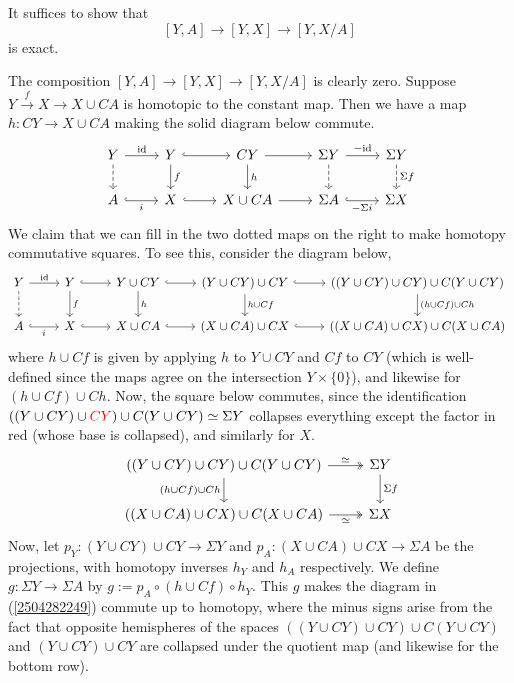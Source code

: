 \documentclass{MetricNotes2023}
\def\id{\ensuremath\text{id}}
\def\textcolour{\textcolor}
\begin{document}
\begin{ourproof}
It suffices to show that 
\[[Y,A]\to [Y,X]\to [Y, X/A]\]
is exact. 

The composition \([Y,A]\to [Y,X]\to [Y,X/A]\) is clearly zero. Suppose \(Y \xrightarrow{f} X \to X\cup CA\) is homotopic to the constant map. Then we have a map \(h : CY \to X\cup CA\) making the solid diagram below commute.
\begin{equation}\label{2504282249}
\begin{tikzcd} 
Y \arrow[r, "\id"] \arrow[d, swap, "", dashrightarrow]  & Y \arrow[r, "", hookrightarrow] \arrow[d, "f"] & CY \arrow[d, "h"] \arrow[r, ""] & \Sigma Y \arrow[d, "", dashrightarrow] \arrow[r, "-\id"] & \Sigma Y \arrow[d, "\Sigma f", dashrightarrow]\\ 
 A \arrow[r, swap, "i", hookrightarrow]  & X \arrow[r, ""', hookrightarrow] & X\cup CA \arrow[r, ""'] & \Sigma A \arrow[r, "-\Sigma i"', hookrightarrow] & \Sigma X 
\end{tikzcd}
\end{equation}
We claim that we can fill in the two dotted maps on the right to make homotopy commutative squares. To see this, consider the diagram below,
\[\begin{tikzcd} 
Y \arrow[r, "\id"] \arrow[d, swap, "", dashrightarrow]  & Y \arrow[r, "", hookrightarrow] \arrow[d, "f"] & Y\cup CY \arrow[d, "h"] \arrow[r, "", hookrightarrow] & (Y\cup CY)\cup CY \arrow[d, "h\cup Cf"] \arrow[r, "", hookrightarrow] & ((Y\cup CY)\cup CY)\cup C(Y\cup CY) \arrow[d, "(h\cup Cf)\cup Ch"]\\ 
 A \arrow[r, swap, "i", hookrightarrow]  & X \arrow[r, ""', hookrightarrow] & X\cup CA \arrow[r, ""', hookrightarrow] & (X\cup CA)\cup CX \arrow[r, ""', hookrightarrow] & ((X\cup CA)\cup CX) \cup C(X\cup CA)
 \end{tikzcd}\] 
where \(h\cup Cf\) is given by applying \(h\) to \(Y\cup CY\) and \(Cf\) to \(CY\) (which is well-defined since the maps agree on the intersection \(Y\times \{0\}\)), and likewise for \((h\cup Cf)\cup Ch\). Now, the square below commutes, since the identification \(((Y\cup CY)\cup \textcolour{red}{CY})\cup C(Y\cup CY)\simeq \Sigma Y\) collapses everything except the factor in red (whose base is collapsed), and similarly for \(X\). 
\[\begin{tikzcd}
((Y\cup CY)\cup CY)\cup C(Y\cup CY) \arrow[r, "\simeq", twoheadrightarrow] \arrow[d, swap, "(h\cup Cf)\cup Ch"]  & \Sigma Y \arrow[d, "\Sigma f"]  \\
((X\cup CA)\cup CX)\cup C(X\cup CA) \arrow[r, swap, "\simeq", twoheadrightarrow]  & \Sigma X
\end{tikzcd}\]
Now, let \(p_Y : (Y\cup CY)\cup CY \to \Sigma Y\) and \(p_A : (X\cup CA)\cup CX\to \Sigma A\) be the projections, with homotopy inverses \(h_Y\) and \(h_A\) respectively. We define \(g : \Sigma Y \to \Sigma A\) by \(g := p_A \circ (h\cup Cf)\circ h_Y\). This \(g\) makes the diagram in (\ref{2504282249}) commute up to homotopy, where the minus signs arise from the fact that opposite hemispheres of the spaces \(((Y\cup CY)\cup CY)\cup C(Y\cup CY)\) and \((Y\cup CY)\cup CY\) are collapsed under the quotient map (and likewise for the bottom row). 


\end{ourproof}
\end{document}
